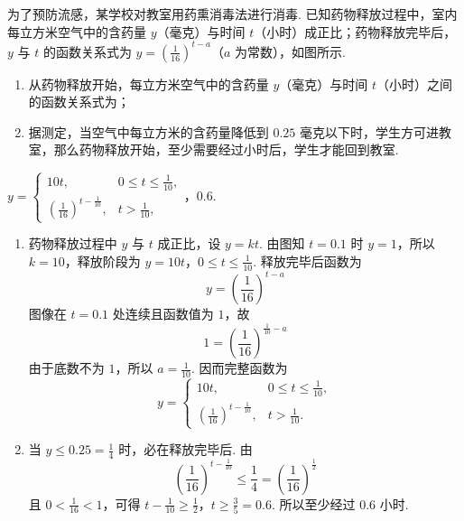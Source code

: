 \begin{problem}
为了预防流感，某学校对教室用药熏消毒法进行消毒. 已知药物释放过程中，室内每立方米空气中的含药量 \(y\)（毫克）与时间 \(t\)（小时）成正比；药物释放完毕后，\(y\) 与 \(t\) 的函数关系式为 \(y = \left(\frac{1}{16}\right)^{t - a}\)（\(a\) 为常数），如图所示.

\begin{enumerate}
\item 从药物释放开始，每立方米空气中的含药量 \(y\)（毫克）与时间 \(t\)（小时）之间的函数关系式为\fillinblank{}；
\item 据测定，当空气中每立方米的含药量降低到 \(0.25\) 毫克以下时，学生方可进教室，那么药物释放开始，至少需要经过\fillinblank{}小时后，学生才能回到教室.
\end{enumerate}

\end{problem}

\begin{answer}
\(
y=\begin{cases}
10t,&0\leqslant t\leqslant\frac{1}{10},\\
\displaystyle\left(\frac{1}{16}\right)^{t-\frac{1}{10}},&t>\frac{1}{10},
\end{cases}
\)，\(0.6\).
\end{answer}

\begin{solution}
\begin{enumerate}
\item
药物释放过程中 \(y\) 与 \(t\) 成正比，设 \(y=kt\). 由图知 \(t=0.1\) 时 \(y=1\)，所以 \(k=10\)，释放阶段为
\(y=10t\)，\(0\leqslant t\leqslant\frac1{10}\).
释放完毕后函数为
\[
y=\left(\frac1{16}\right)^{t-a}
\]
图像在 \(t=0.1\) 处连续且函数值为 \(1\)，故
\[
1=\left(\frac1{16}\right)^{\frac1{10}-a}
\]
由于底数不为 \(1\)，所以 \(a=\frac{1}{10}\). 因而完整函数为
\[
y=\begin{cases}
10t,&0\leqslant t\leqslant\frac1{10},\\
\displaystyle\left(\frac1{16}\right)^{t-\frac1{10}},&t>\frac1{10}.
\end{cases}
\]

\item
当 \(y\leqslant0.25=\frac{1}{4}\) 时，必在释放完毕后. 由
\[
\left(\frac1{16}\right)^{t-\frac1{10}}\leqslant\frac14
=\left(\frac1{16}\right)^{\frac{1}{2}}
\]
且 \(0<\frac{1}{16}<1\)，可得
\(t-\frac1{10}\geqslant\frac12\)，\(t\geqslant\frac35=0.6\).
所以至少经过 \(0.6\) 小时.
\end{enumerate}
\end{solution}

